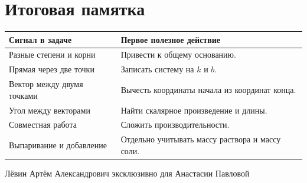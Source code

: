 \documentclass[a4paper,11pt]{article}
\newcommand{\secname}[1]{\section*{\color{darkaccent}#1}\vspace{-4pt}\color{black}}
\begin{document}
\vspace{10mm}
\secname{Итоговая памятка}
\begin{center}
\small
\begin{tabularx}{\linewidth}{>{\raggedright\arraybackslash}p{4.7cm}X}
\toprule
\textbf{Сигнал в задаче} & \textbf{Первое полезное действие}\\
\midrule
Разные степени и корни & Привести к общему основанию.\\
Прямая через две точки & Записать систему на $k$ и $b$.\\
Вектор между двумя точками & Вычесть координаты начала из координат конца.\\
Угол между векторами & Найти скалярное произведение и длины.\\
Совместная работа & Сложить производительности.\\
Выпаривание и добавление & Отдельно учитывать массу раствора и массу соли.\\
\bottomrule
\end{tabularx}
\end{center}
\vfill
\begin{center}\footnotesize\color{muted} Лёвин Артём Александрович \quad\textbullet\quad эксклюзивно для Анастасии Павловой\end{center}
\end{document}
